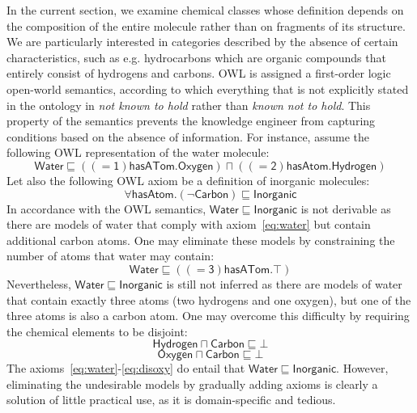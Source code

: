 \documentclass[10pt]{bmc_article}
\newenvironment{bmcformat}{\baselineskip20pt\sloppy\setboolean{publ}{false}}{\baselineskip20pt\sloppy}
\begin{document}
\begin{bmcformat}
In the current section, we examine chemical classes whose definition depends on the composition of the entire molecule rather than on fragments of its structure. We are particularly interested in categories described by the absence of certain characteristics, such as e.g. hydrocarbons which are organic compounds that entirely consist of hydrogens and carbons. OWL is assigned a first-order logic open-world semantics, according to which everything that is not explicitly stated in the ontology in \emph{not known to hold} rather than \emph{known not to hold}. This property of the semantics prevents the knowledge engineer from capturing conditions based on the absence of information. For instance, assume the following OWL representation of the water molecule:
%
\begin{equation}
\label{eq:water}
\mathsf{Water \sqsubseteq ((= 1)hasATom.Oxygen) \sqcap ((= 2) hasAtom.Hydrogen)}
\end{equation}
%
Let also the following OWL axiom be a definition of inorganic molecules:
\begin{equation}
\label{eq:inorganic}
\mathsf{\forall hasAtom.(\neg Carbon) \sqsubseteq Inorganic}
\end{equation}
In accordance with the OWL semantics, $\mathsf{Water \sqsubseteq Inorganic}$ is not derivable as there are models of water that comply with axiom~\eqref{eq:water} but contain additional carbon atoms. One may eliminate these models by constraining the number of atoms that water may contain:
\begin{equation}
\label{eq:three}
\mathsf{Water \sqsubseteq ((= 3)hasATom.\top) }
\end{equation}
%
Nevertheless, $\mathsf{Water \sqsubseteq Inorganic}$ is still not inferred as there are models of water that contain exactly three atoms (two hydrogens and one oxygen), but one of the three atoms is also a carbon atom. One may overcome this difficulty by requiring the chemical elements to be disjoint:
\begin{equation}
\label{eq:dishyd}
\mathsf{Hydrogen\sqcap Carbon \sqsubseteq \bot }
\end{equation}
\begin{equation}
\label{eq:disoxy}
\mathsf{Oxygen\sqcap Carbon \sqsubseteq \bot }
\end{equation}
The axioms~\eqref{eq:water}-\eqref{eq:disoxy} do entail that $\mathsf{Water \sqsubseteq Inorganic}$. However, eliminating the undesirable models by gradually adding axioms is clearly a solution of little practical use, as it is domain-specific and tedious.


\end{bmcformat}
\end{document}
